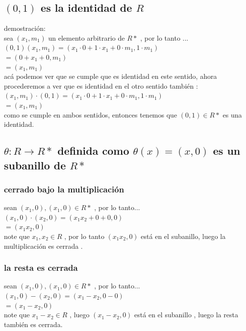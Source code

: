 \documentclass[10pt,a4paper]{article} %
\begin{document}
                \subsection{ $ (0,1)  $  es la identidad de $ R  $  }
            demostración:
            \\
            sea $ (x_1 , m_1)  $  un elemento arbitrario de $ R*  $  , por lo tanto ...
            \\
            $ (0,1)(x_1,m_1) = (x_1 \cdot 0 + 1 \cdot x_1 + 0 \cdot m_1 , 1 \cdot m_1) $
            \\
            $ = (0 + x_1 + 0  , m_1 )  $
            \\
            $ =(x_1,m_1)  $
            \\
            acá podemos ver que se cumple que es identidad en este sentido, ahora
            procederemos a ver que es identidad en el otro sentido también :
            \\
            $ (x_1 , m_1 ) \cdot (0 ,1 ) = (x_1 \cdot 0 + 1 \cdot x_1  + 0 \cdot m_1  , 1 \cdot m_1)  $
            \\
            $ = (x_1,m_1)  $
            \\
            como se cumple en ambos sentidos, entonces tenemos que $ (0,1) \in
            R*  $ es una identidad.


            \subsection{$ \theta : R \to R*  $ definida como $ \theta (x) =
            (x,0)  $ es un subanillo de $ R*  $ }
                \subsubsection{cerrado bajo la multiplicación}
                    sean $ (x_1 , 0) , (x_1 ,0) \in R*  $ , por lo tanto...
                    \\
                    $ (x_1,0) \cdot (x_2,0) = (x_1x_2 + 0 + 0 , 0 )  $
                    \\
                    $ = (x_1x_2 , 0 )  $
                    \\
                    note que $ x_1 , x_2 \in R  $ , por lo tanto $ (x_1x_2 , 0)
                     $ está en el subanillo, luego la multiplicación es cerrada .
                \subsubsection{la resta es cerrada}
                    sean $ (x_1 , 0) , (x_1 ,0) \in R*  $ , por lo tanto...
                    \\
                    $ (x_1 ,0) - (x_2 , 0) = (x_1 - x_2 , 0 -0 )  $
                    \\
                    $ = (x_1 -x_2 , 0)  $
                    \\
                    note que $ x_1-x_2 \in R  $ , luego  $ (x_1 -x_2 , 0)  $
                    está en el subanillo ,  luego la resta también es cerrada.
\end{document}
